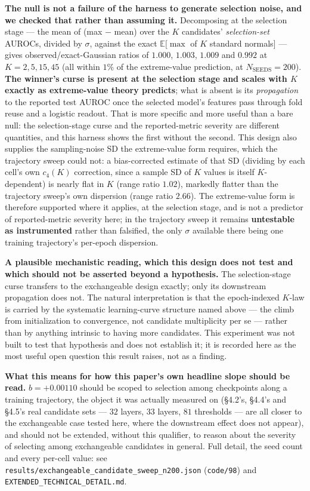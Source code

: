 \documentclass[10pt]{article} %
\begin{document}
\textbf{The null is not a failure of the harness to generate selection noise,
and we checked that rather than assuming it.} Decomposing at the selection
stage --- the mean of (max $-$ mean) over the $K$ candidates'
\emph{selection-set} AUROCs, divided by $\sigma$, against the exact
$\mathbb{E}[\max$ of $K$ standard normals$]$ --- gives observed/exact-Gaussian
ratios of $1.000$, $1.003$, $1.009$ and $0.992$ at $K=2,5,15,45$ (all within
$1\%$ of the extreme-value prediction, at $N_{\text{SEEDS}}=200$).
\textbf{The winner's curse is present at the selection stage and scales with
$K$ exactly as extreme-value theory predicts}; what is absent is its
\emph{propagation} to the reported test AUROC once the selected model's
features pass through fold reuse and a logistic readout. That is more
specific and more useful than a bare null: the selection-stage curse and the
reported-metric severity are different quantities, and this harness shows
the first without the second. This design also supplies the sampling-noise
SD the extreme-value form requires, which the trajectory sweep could not: a
bias-corrected estimate of that SD (dividing by each cell's own
$c_4(K)$ correction, since a sample SD of $K$ values is itself $K$-dependent)
is nearly flat in $K$ (range ratio $1.02$), markedly flatter than the
trajectory sweep's own dispersion (range ratio $2.66$). The extreme-value
form is therefore supported where it applies, at the selection stage, and is
not a predictor of reported-metric severity here; in the trajectory sweep it
remains \textbf{untestable as instrumented} rather than falsified, the only
$\sigma$ available there being one training trajectory's per-epoch
dispersion.

\textbf{A plausible mechanistic reading, which this design does not test and
which should not be asserted beyond a hypothesis.} The selection-stage curse
transfers to the exchangeable design exactly; only its downstream propagation
does not. The natural interpretation is that the epoch-indexed $K$-law is
carried by the systematic learning-curve structure named above --- the climb
from initialization to convergence, not candidate multiplicity per se ---
rather than by anything intrinsic to having more candidates. This experiment was not built to test that hypothesis and does
not establish it; it is recorded here as the most useful open question this
result raises, not as a finding.

\textbf{What this means for how this paper's own headline slope should be
read.} $b=+0.00110$ should be scoped to selection among checkpoints along a
training trajectory, the object it was actually measured on (§4.2's,
§4.4's and §4.5's real candidate sets --- $32$ layers, $33$ layers, $81$
thresholds --- are all closer to the exchangeable case tested here, where the
downstream effect does not appear), and should not be extended, without this
qualifier, to reason about the severity of selecting among exchangeable
candidates in general. Full detail, the seed count and every per-cell value:
see \texttt{results/exchangeable\_candidate\_sweep\_n200.json}
(\texttt{code/98}) and \texttt{EXTENDED\_TECHNICAL\_DETAIL.md}.
\end{document}
